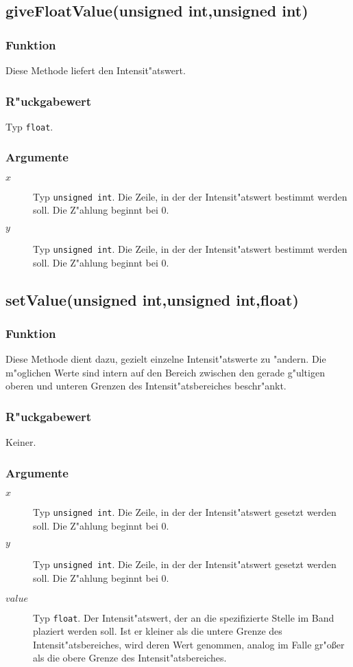 \documentclass[12pt,a4paper,draft,twoside,onecolumn,titlepage]{book}
\newcommand{\carg}[1]{$ #1 $}
\newcommand{\ctyp}[1]{{\tt #1}}
\newcommand{\arglist}[1]{\footnotesize{#1}}
\begin{document}
\subsection{giveFloatValue\arglist{(unsigned int,unsigned int)}}
\subsubsection{Funktion}
Diese Methode liefert den Intensit"atswert.
\subsubsection{R"uckgabewert}
Typ \ctyp{float}. 
\subsubsection{Argumente}
\begin{description}
\item[\carg{x}]{Typ \ctyp{unsigned int}.  Die Zeile, in der der Intensit"atswert bestimmt werden soll. Die Z"ahlung beginnt bei $0$.} 
\item[\carg{y}]{Typ \ctyp{unsigned int}.  Die Zeile, in der der Intensit"atswert bestimmt werden soll. Die Z"ahlung beginnt bei $0$.} 
\end{description}
\subsection{setValue\arglist{(unsigned int,unsigned int,float)}}
\subsubsection{Funktion}
Diese Methode dient dazu, gezielt einzelne Intensit"atswerte zu "andern. Die m"oglichen Werte sind intern auf den Bereich zwischen den gerade g"ultigen oberen und unteren Grenzen des Intensit"atsbereiches beschr"ankt.
\subsubsection{R"uckgabewert}
Keiner.
\subsubsection{Argumente} 
\begin{description}
\item[\carg{x}]{Typ \ctyp{unsigned int}.  Die Zeile, in der der Intensit"atswert gesetzt werden soll. Die Z"ahlung beginnt bei $0$.} 
\item[\carg{y}]{Typ \ctyp{unsigned int}.  Die Zeile, in der der Intensit"atswert gesetzt werden soll. Die Z"ahlung beginnt bei $0$.} 
\item[\carg{value}]{Typ \ctyp{float}. Der Intensit"atswert, der an die spezifizierte Stelle im Band plaziert werden soll. Ist er kleiner als die untere Grenze des Intensit"atsbereiches, wird deren Wert genommen, analog im Falle gr"o{\ss}er als die obere Grenze des Intensit"atsbereiches.}
\end{description}
\end{document}
